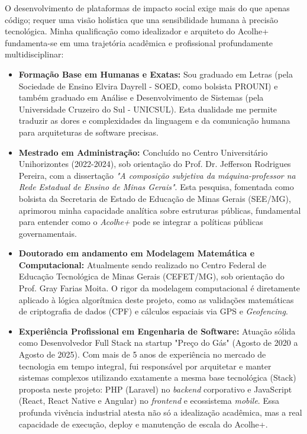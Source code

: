 \documentclass[12pt, a4paper]{article}
\begin{document}
O desenvolvimento de plataformas de impacto social exige mais do que apenas código; requer uma visão holística que una sensibilidade humana à precisão tecnológica. Minha qualificação como idealizador e arquiteto do Acolhe+ fundamenta-se em uma trajetória acadêmica e profissional profundamente multidisciplinar:

\begin{itemize}
    \item \textbf{Formação Base em Humanas e Exatas:} Sou graduado em Letras (pela Sociedade de Ensino Elvira Dayrell - SOED, como bolsista PROUNI) e também graduado em Análise e Desenvolvimento de Sistemas (pela Universidade Cruzeiro do Sul - UNICSUL). Esta dualidade me permite traduzir as dores e complexidades da linguagem e da comunicação humana para arquiteturas de software precisas.
    
    \item \textbf{Mestrado em Administração:} Concluído no Centro Universitário Unihorizontes (2022-2024), sob orientação do Prof. Dr. Jefferson Rodrigues Pereira, com a dissertação \textit{"A composição subjetiva da máquina-professor na Rede Estadual de Ensino de Minas Gerais"}. Esta pesquisa, fomentada como bolsista da Secretaria de Estado de Educação de Minas Gerais (SEE/MG), aprimorou minha capacidade analítica sobre estruturas públicas, fundamental para entender como o \textit{Acolhe+} pode se integrar a políticas públicas governamentais.
    
    \item \textbf{Doutorado em andamento em Modelagem Matemática e Computacional:} Atualmente sendo realizado no Centro Federal de Educação Tecnológica de Minas Gerais (CEFET/MG), sob orientação do Prof. Gray Farias Moita. O rigor da modelagem computacional é diretamente aplicado à lógica algorítmica deste projeto, como as validações matemáticas de criptografia de dados (CPF) e cálculos espaciais via GPS e \textit{Geofencing}.
    
    \item \textbf{Experiência Profissional em Engenharia de Software:} Atuação sólida como Desenvolvedor Full Stack na startup "Preço do Gás" (Agosto de 2020 a Agosto de 2025). Com mais de 5 anos de experiência no mercado de tecnologia em tempo integral, fui responsável por arquitetar e manter sistemas complexos utilizando exatamente a mesma base tecnológica (Stack) proposta neste projeto: PHP (Laravel) no \textit{backend} corporativo e JavaScript (React, React Native e Angular) no \textit{frontend} e ecossistema \textit{mobile}. Essa profunda vivência industrial atesta não só a idealização acadêmica, mas a real capacidade de execução, deploy e manutenção de escala do Acolhe+.
\end{itemize}
\end{document}
